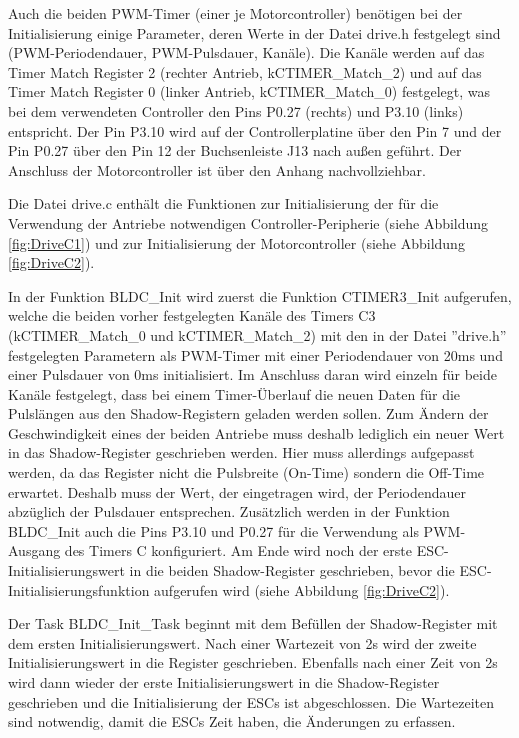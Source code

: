 Auch die beiden \ac{PWM}-Timer (einer je Motorcontroller) benötigen bei der Initialisierung einige Parameter, deren Werte in der Datei \glqq{}drive.h\grqq{} festgelegt sind (PWM-Periodendauer, \ac{PWM}-Pulsdauer, Kanäle). Die Kanäle werden auf das Timer Match Register 2 (rechter Antrieb, \glqq{}kCTIMER\_Match\_2\grqq{}) und auf das Timer Match Register 0 (linker Antrieb, \glqq{}kCTIMER\_Match\_0\grqq{}) festgelegt, was bei dem verwendeten Controller den Pins P0.27 (rechts) und P3.10 (links) entspricht. Der Pin P3.10 wird auf der Controllerplatine über den Pin 7 und der Pin P0.27 über den Pin 12 der Buchsenleiste J13 nach außen geführt. Der Anschluss der Motorcontroller ist über den Anhang \glqq{}\grqq{} nachvollziehbar.\vspace{11pt}

Die Datei \glqq{}drive.c\grqq{} enthält die Funktionen zur Initialisierung der für die Verwendung der Antriebe notwendigen Controller-Peripherie (siehe Abbildung \ref{fig:DriveC1}) und zur Initialisierung der Motorcontroller (siehe Abbildung \ref{fig:DriveC2}).\vspace{11pt}

In der Funktion BLDC\_Init wird zuerst die Funktion CTIMER3\_Init aufgerufen, welche die beiden vorher festgelegten Kanäle des Timers C3 (\glqq{}kCTIMER\_Match\_0\grqq{} und \glqq{}kCTIMER\_Match\_2\grqq{}) mit den in der Datei ''drive.h'' festgelegten Parametern als \ac{PWM}-Timer mit einer Periodendauer von 20ms und einer Pulsdauer von 0ms initialisiert. Im Anschluss daran wird einzeln für beide Kanäle festgelegt, dass bei einem Timer-Überlauf die neuen Daten für die Pulslängen aus den Shadow-Registern geladen werden sollen. Zum Ändern der Geschwindigkeit eines der beiden Antriebe muss deshalb lediglich ein neuer Wert in das Shadow-Register geschrieben werden. Hier muss allerdings aufgepasst werden, da das Register nicht die Pulsbreite (On-Time) sondern die Off-Time erwartet. Deshalb muss der Wert, der eingetragen wird, der Periodendauer abzüglich der Pulsdauer entsprechen. Zusätzlich werden in der Funktion BLDC\_Init auch die Pins P3.10 und P0.27 für die Verwendung als \ac{PWM}-Ausgang des Timers C konfiguriert. Am Ende wird noch der erste \ac{ESC}-Initialisierungswert in die beiden Shadow-Register geschrieben, bevor die \ac{ESC}-Initialisierungsfunktion aufgerufen wird (siehe Abbildung \ref{fig:DriveC2}).\vspace{11pt}

Der Task BLDC\_Init\_Task beginnt mit dem Befüllen der Shadow-Register mit dem ersten Initialisierungswert. Nach einer Wartezeit von 2s wird der zweite Initialisierungswert in die Register geschrieben. Ebenfalls nach einer Zeit von 2s wird dann wieder der erste Initialisierungswert in die Shadow-Register geschrieben und die Initialisierung der \ac{ESC}s ist abgeschlossen. Die Wartezeiten sind notwendig, damit die \ac{ESC}s Zeit haben, die Änderungen zu erfassen.

